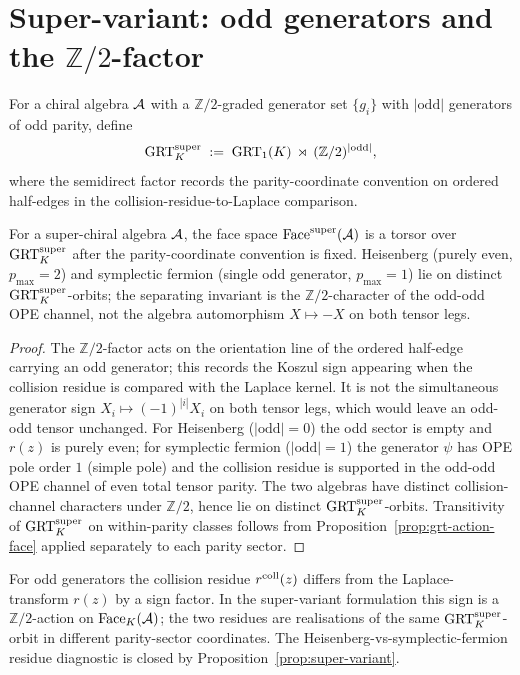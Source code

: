 \section{Super-variant: odd generators and the $\mathbb{Z}/2$-factor}
\label{sec:super}

\begin{definition}
For a chiral algebra $\mathcal{A}$ with a $\mathbb{Z}/2$-graded generator
set $\{g_i\}$ with $|\mathrm{odd}|$ generators of odd parity, define
\[
 \mathrm{GRT}^{\mathrm{super}}_K \;:=\; \mathrm{GRT}_1(K)\,\rtimes\,(\mathbb{Z}/2)^{|\mathrm{odd}|},
\]
where the semidirect factor records the parity-coordinate convention
on ordered half-edges in the collision-residue-to-Laplace comparison.
\end{definition}

\begin{proposition}
For a super-chiral algebra $\mathcal{A}$, the face space
$\mathrm{Face}^{\mathrm{super}}(\mathcal{A})$ is a torsor over $\mathrm{GRT}^{\mathrm{super}}_K$ after the parity-coordinate
convention is fixed. Heisenberg
(purely even, $p_{\max}=2$) and symplectic fermion (single odd
generator, $p_{\max}=1$) lie on distinct $\mathrm{GRT}^{\mathrm{super}}_K$-orbits; the
separating invariant is the $\mathbb{Z}/2$-character of the
odd-odd OPE channel, not the algebra automorphism
$X\mapsto -X$ on both tensor legs.
\end{proposition}

\begin{proof}
The $\mathbb{Z}/2$-factor acts on the orientation line of the ordered
half-edge carrying an odd generator; this records the Koszul sign
appearing when the collision residue is compared with the Laplace
kernel. It is not the simultaneous generator sign
$X_i\mapsto(-1)^{|i|}X_i$ on both tensor legs, which would leave an
odd-odd tensor unchanged.
For Heisenberg ($|\mathrm{odd}|=0$) the odd sector is empty and
$r(z)$ is purely even; for symplectic fermion
($|\mathrm{odd}|=1$) the generator $\psi$ has OPE pole order $1$
(simple pole) and the collision residue is supported in the odd-odd
OPE channel of even total tensor parity. The two algebras have distinct collision-channel
characters under $\mathbb{Z}/2$, hence lie on distinct
$\mathrm{GRT}^{\mathrm{super}}_K$-orbits. Transitivity of $\mathrm{GRT}^{\mathrm{super}}_K$ on within-parity
classes follows from Proposition~\ref{prop:grt-action-face}
applied separately to each parity sector.
\end{proof}

\begin{remark}
For odd generators the collision residue
$r^{\mathrm{coll}}(z)$ differs from the Laplace-transform $r(z)$ by a
sign factor. In the super-variant formulation this sign is a
$\mathbb{Z}/2$-action on $\mathrm{Face}_K(\mathcal{A})$; the two residues are
realisations of the same $\mathrm{GRT}^{\mathrm{super}}_K$-orbit in different
parity-sector coordinates. The Heisenberg-vs-symplectic-fermion
residue diagnostic is closed by Proposition~\ref{prop:super-variant}.
\end{remark}

